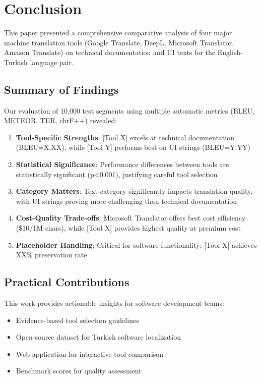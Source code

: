 \section{Conclusion}

This paper presented a comprehensive comparative analysis of four major machine translation tools (Google Translate, DeepL, Microsoft Translator, Amazon Translate) on technical documentation and UI texts for the English-Turkish language pair.

\subsection{Summary of Findings}

Our evaluation of 10,000 test segments using multiple automatic metrics (BLEU, METEOR, TER, chrF++) revealed:

\begin{enumerate}
    \item \textbf{Tool-Specific Strengths}: [Tool X] excels at technical documentation (BLEU=X.XX), while [Tool Y] performs best on UI strings (BLEU=Y.YY)
    
    \item \textbf{Statistical Significance}: Performance differences between tools are statistically significant (p<0.001), justifying careful tool selection
    
    \item \textbf{Category Matters}: Text category significantly impacts translation quality, with UI strings proving more challenging than technical documentation
    
    \item \textbf{Cost-Quality Trade-offs}: Microsoft Translator offers best cost efficiency (\$10/1M chars), while [Tool X] provides highest quality at premium cost
    
    \item \textbf{Placeholder Handling}: Critical for software functionality; [Tool X] achieves XX\% preservation rate
\end{enumerate}

\subsection{Practical Contributions}

This work provides actionable insights for software development teams:

\begin{itemize}
    \item Evidence-based tool selection guidelines
    \item Open-source dataset for Turkish software localization
    \item Web application for interactive tool comparison
    \item Benchmark scores for quality assessment
\end{itemize}

